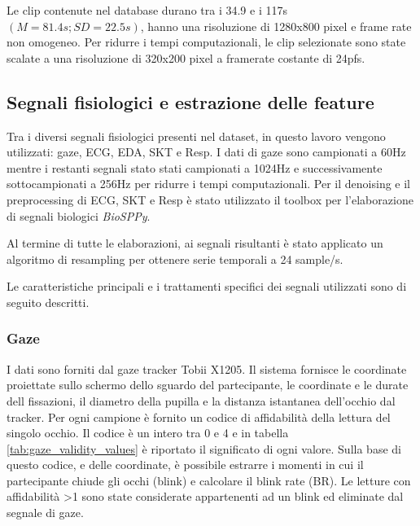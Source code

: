 Le clip contenute nel database durano tra i 34.9 e i 117s $(M=81.4s; SD=22.5s)$, hanno una risoluzione di 1280x800 pixel e frame rate non omogeneo. Per ridurre i tempi computazionali, le clip selezionate sono state scalate a una risoluzione di 320x200 pixel a framerate costante di 24pfs.

\subsection{Segnali fisiologici e estrazione delle feature}

Tra i diversi segnali fisiologici presenti nel dataset, in questo lavoro vengono utilizzati: gaze, ECG, EDA, SKT e Resp.
I dati di gaze sono campionati a 60Hz mentre i restanti segnali stato stati campionati a 1024Hz e successivamente sottocampionati a 256Hz per ridurre i tempi computazionali. Per il denoising e il preprocessing di ECG, SKT e Resp è stato utilizzato il toolbox per l'elaborazione di segnali biologici \emph{BioSPPy}\cite{carreiras2018biosppy}.

Al termine di tutte le elaborazioni, ai segnali risultanti è stato applicato un algoritmo di resampling per ottenere serie temporali a 24 sample/s.

Le caratteristiche principali e i trattamenti specifici dei segnali utilizzati sono di seguito descritti.

\subsubsection{Gaze}
I dati sono forniti dal gaze tracker Tobii X1205. Il sistema fornisce le coordinate proiettate sullo schermo dello sguardo del partecipante, le coordinate e le durate dell fissazioni, il diametro della pupilla e la distanza istantanea dell'occhio dal tracker. Per ogni campione è fornito un codice di affidabilità della lettura del singolo occhio. Il codice è un intero tra 0 e 4 e in tabella \ref{tab:gaze_validity_values} è riportato il significato di ogni valore. Sulla base di questo codice, e delle coordinate, è possibile estrarre i momenti in cui il partecipante chiude gli occhi (blink) e calcolare il blink rate (BR). Le letture con affidabilità >1 sono state considerate appartenenti ad un blink ed eliminate dal segnale di gaze.

